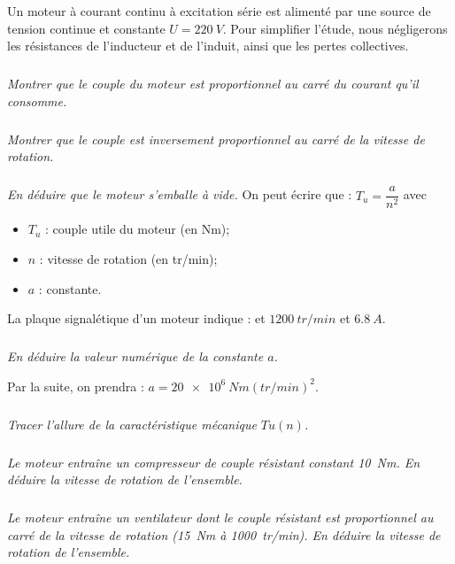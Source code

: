 \documentclass[10pt,fleqn]{article} %
\begin{document}
\begin{multicols}{2}
\begin{multicols}{2}
\setcounter{exo}{0}

Un moteur à courant continu à excitation série est alimenté par une source de tension continue
et constante $U = \SI{220}{V}$.
Pour simplifier l’étude, nous négligerons les résistances de l’inducteur et de l’induit, ainsi que
les pertes collectives.

\subparagraph{}\textit{Montrer que le couple du moteur est proportionnel au carré du courant qu’il consomme.}
\ifprof
\begin{corrige}
\end{corrige}
\else
\fi

\subparagraph{}\textit{Montrer que le couple est inversement proportionnel au carré de la vitesse de rotation.}
\ifprof
\begin{corrige}
\end{corrige}
\else
\fi

\subparagraph{}\textit{En déduire que le moteur s’emballe à vide.}
On peut écrire que : $T_u = \dfrac{a}{n^2}$ avec 
\begin{itemize}
\item $T_u$ : couple utile du moteur (en Nm);
\item $n$ : vitesse de rotation (en tr/min);
\item $a$ : constante.
\end{itemize}
La plaque signalétique d’un moteur indique :  et $\SI{1200}{tr/min}$ et $\SI{6,8}{A}$.

\subparagraph{}\textit{En déduire la valeur numérique de la constante $a$.}
\ifprof
\begin{corrige}
\end{corrige}
\else
\fi

Par la suite, on prendra : $a = \SI{20e6}{Nm(tr/min)^2}$.



\subparagraph{}\textit{Tracer l’allure de la caractéristique mécanique $Tu(n)$.}
\ifprof
\begin{corrige}
\end{corrige}
\else
\fi

\subparagraph{}\textit{Le moteur entraîne un compresseur de couple résistant constant \SI{10}{Nm}.
En déduire la vitesse de rotation de l’ensemble.}
\ifprof
\begin{corrige}
\end{corrige}
\else
\fi

\subparagraph{}\textit{Le moteur entraîne un ventilateur dont le couple résistant est proportionnel au carré de la
vitesse de rotation (\SI{15}{Nm} à \SI{1000}{tr/min}).
En déduire la vitesse de rotation de l’ensemble.}




\end{multicols}
\end{multicols}
\end{document}
